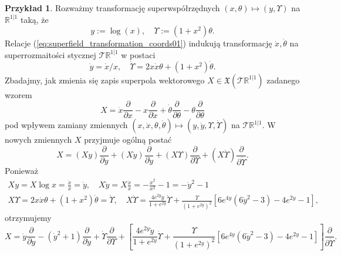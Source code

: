 \documentclass[11pt,a4paper]{report}
\theoremstyle{definition}
\newtheorem{example}[theorem]{Przykład}
\begin{document}
\begin{example} 
Rozważmy transformację superwspółrzędnych $(x, \theta) \mapsto (y, \Upsilon)$ na $\mathbb{R}^{1|1}$ taką, że
\begin{equation}
\label{eq:superfield_transformation_coords01}
 y:= \log (x), \quad \Upsilon := (1+x^2) \theta.
\end{equation}
Relacje (\ref{eq:superfield_transformation_coords01}) indukują transformację $\dot x, \dot \theta$ na superrozmaitości stycznej $\mathcal{T} \mathbb{R}^{1|1}$ w postaci 
\begin{equation}
\label{eq:superfield_transformation_coords02}
\dot y=\dot x/x,\quad \dot \Upsilon=2x\dot x\theta+(1+x^2)\dot \theta.
\end{equation}
Zbadajmy, jak zmienia się zapis superpola wektorowego $X \in \mathfrak{X}(\mathcal{T} \mathbb{R}^{1|1})$ zadanego wzorem
\begin{equation}
\label{eq:the_x_equation}
X=\dot x\frac{\partial}{\partial x}-x\frac{\partial}{\partial \dot x}+\dot\theta\frac{\partial}{\partial \theta}-\theta\frac{\partial}{\partial \theta}
\end{equation}
pod wpływem zamiany zmiennych $(x, \dot x, \theta, \dot \theta) \mapsto (y, \dot y, \Upsilon, \dot \Upsilon)$ na $\mathcal{T}\mathbb{R}^{1|1}$. W nowych zmiennych $X$ przyjmuje ogólną postać
\begin{equation*}
X=(Xy)\frac{\partial}{\partial y}+(X\dot y)\frac{\partial}{\partial \dot y}+(X\Upsilon)\frac{\partial}{\partial \Upsilon}+(X\dot \Upsilon)\frac{\partial}{\partial \dot\Upsilon}.
\end{equation*}
Ponieważ
\begin{equation*}
\begin{gathered}
Xy=X\log x=\frac{\dot x}{x}=\dot y,\quad X\dot y=X\frac{\dot x}{x}=-\frac{\dot x^2}{x^2}-1=-\dot y^2-1 \\
X\Upsilon=2x\dot x\theta+(1+x^2)\dot\theta =\dot \Upsilon, \quad X\dot\Upsilon=\frac{4e^{2y}\dot y}{1+e^{2y}}\dot\Upsilon +\frac{\Upsilon}{(1+e^{2y})^2}[6e^{4y}(6\dot y^2-3)-4e^{2y}-1],
\end{gathered}
\end{equation*}
otrzymujemy
\begin{equation*}
X=\dot y\frac{\partial}{\partial y}-(\dot y^2+1)\frac{\partial }{\partial \dot y}+\dot\Upsilon\frac{\partial}{\partial \Upsilon}+\left[\frac{4e^{2y}\dot y}{1+e^{2y}}\dot\Upsilon +\frac{\Upsilon}{(1+e^{2y})^2}[6e^{4y}(6\dot y^2-3)-4e^{2y}-1]\right]\frac{\partial}{\partial \dot\Upsilon}.
\end{equation*}
\end{example}
\end{document}
